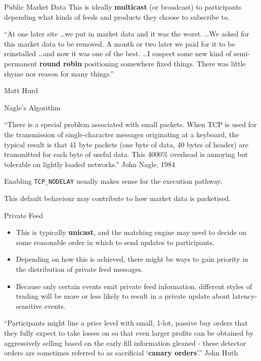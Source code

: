 \documentclass{beamer}
\begin{document}
\begin{frame}{Public Market Data}
	This is ideally \textbf{multicast} (or broadcast) to participants depending what kinds of feeds and products they choose to subscribe to.

	\begin{block}{}
		``At one later site \ldots we put in market data and it was the worst. \ldots We asked for this market data to be removed. A month or two later we paid for it to be reinstalled \ldots and now it was one of the best. \ldots I suspect some new kind of semi-permanent \textbf{round robin} positioning somewhere fixed things. There was little rhyme nor reason for many things.''

		Matt Hurd
	\end{block}

\end{frame}

\begin{frame}{Nagle's Algorithm}
	\begin{block}{}
		``There is a special problem associated with small packets. When TCP is used for the transmission of single-character messages originating at a keyboard, the typical result is that 41 byte packets (one byte of data, 40 bytes of header) are transmitted for each byte of useful data. This 4000\% overhead is annoying but tolerable on lightly loaded networks.'' John Nagle, 1984
	\end{block}

	Enabling \texttt{TCP\_NODELAY} usually makes sense for the execution pathway.

	This default behaviour may contribute to how market data is packetised.
\end{frame}

\begin{frame}{Private Feed}
	\begin{itemize}
		\item This is typically \textbf{unicast}, and the matching engine may need to decide on some reasonable order in which to send updates to participants.
		\item Depending on how this is achieved, there might be ways to gain priority in the distribution of private feed messages.
		\item Because only certain events emit private feed information, different styles of trading will be more or less likely to result in a private update about latency-sensitive events.
	\end{itemize}

	\begin{block}{}
		``Participants might line a price level with small, 1-lot, passive buy orders that they fully expect to take losses on so that even larger profits can be obtained by aggressively selling based on the early fill information gleaned - these detector orders are sometimes referred to as sacrificial `\textbf{canary orders}'.'' John Huth
	\end{block}
\end{frame}
\end{document}
